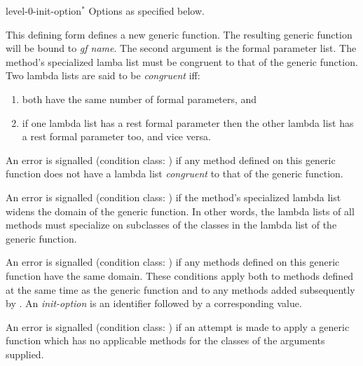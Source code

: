 \begin{optDefinition}
\begin{arguments}
    \item[level-0-init-option\/$^*$\/] Options as specified below.
\end{arguments}
%
\remarks%
This defining form defines a new generic function.  The resulting
generic function will be bound to {\em gf name}.  The second argument
is the formal parameter list.  The method's specialized lamba list
must be congruent to that of the generic function.  Two lambda lists
are said to be {\em congruent\/} iff:
%
\begin{enumerate}
    \item  both have the same number of formal parameters, and
    \item  if one lambda list has a rest formal parameter then the other
    lambda list has a rest formal parameter too, and vice versa.
\end{enumerate}
%
An error is signalled (condition class:
) if any method defined on this
generic function does not have a lambda list {\em congruent\/} to that of the
generic function.

An error is signalled (condition class:
) if the method's specialized lambda
list widens the domain of the generic function.  In other words, the lambda
lists of all methods must specialize on subclasses of the classes in the lambda
list of the generic function.

An error is signalled (condition class:
) if any
methods defined on this generic function have the same domain.  These conditions
apply both to methods defined at the same time as the generic function and to
any methods added subsequently by .  An {\em init-option\/}
is an identifier followed by a corresponding value.

An error is signalled (condition class:
) if an
attempt is made to apply a generic function which has no applicable methods for
the classes of the arguments supplied.


\end{optDefinition}
